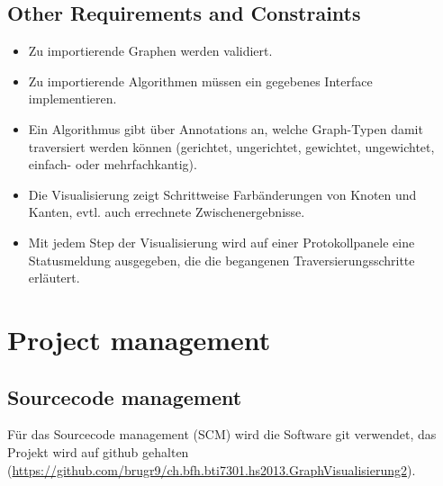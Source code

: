 \subsection{Other Requirements and Constraints}	
\label{subsec:Other Requirements and Constraints}
\begin{itemize}
  \item Zu importierende Graphen werden validiert.
  \item Zu importierende Algorithmen m\"ussen ein gegebenes Interface implementieren.
  \item Ein Algorithmus gibt \"uber Annotations an, welche Graph-Typen damit traversiert werden k\"onnen (gerichtet, ungerichtet, gewichtet, ungewichtet, einfach- oder mehrfachkantig).
  \item Die Visualisierung zeigt Schrittweise Farb\"anderungen von Knoten und Kanten, evtl. auch errechnete Zwischenergebnisse.
  \item Mit jedem Step der Visualisierung wird auf einer Protokollpanele eine Statusmeldung ausgegeben, die die begangenen Traversierungsschritte erl\"autert.
\end{itemize}
% 
\newpage
\section{Project management}
\label{sec:Project management}
% 
\subsection{Sourcecode management}
\label{subsec:Sourcecode management}
F\"ur das Sourcecode management (SCM) wird die Software git verwendet, das Projekt wird auf github gehalten (\url{https://github.com/brugr9/ch.bfh.bti7301.hs2013.GraphVisualisierung2}).
% 
